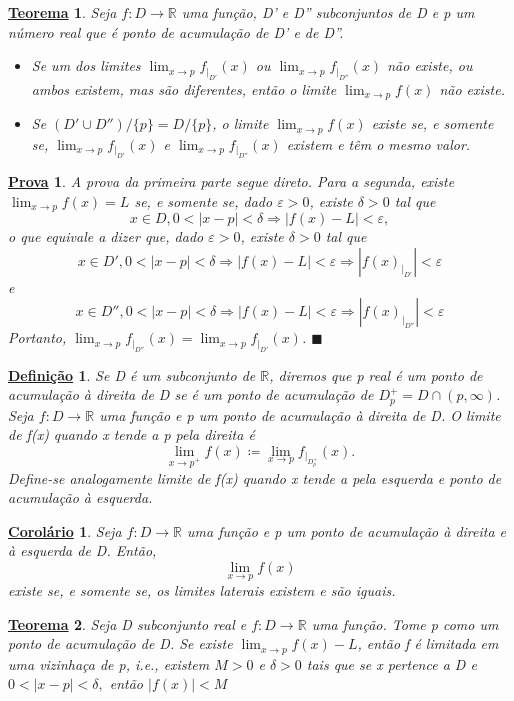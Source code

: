 \documentclass{article}
\newtheorem*{def*}{\underline{Defini\c c\~ao}}
\newtheorem*{theorem*}{\underline{Teorema}}
\newtheorem*{proof*}{\underline{Prova}}
\newtheorem*{crl*}{\underline{Corol\'ario}}
\renewcommand\qedsymbol{$\blacksquare$}
\begin{document}
\begin{theorem*}
  Seja $f:D\rightarrow \mathbb{R}$ uma fun\c c\~ao, D' e D'' subconjuntos de D e p um n\'umero real que \'e ponto de acumula\c c\~ao
de D' e de D''. 
 \begin{itemize}
   \item[i)] Se um dos limites $\lim_{x\to p}f_{|_{D'}}(x)$ ou $\lim_{x\to p}f_{|_{D''}}(x)$ n\~ao existe, ou ambos existem,
     mas s\~ao diferentes, ent\~ao o limite $\lim_{x\to p}f(x)$ n\~ao existe.
   \item[ii)] Se $(D'\cup D'')/\{p\} = D/\{p\}$, o limite $\lim_{x\to p}f(x)$ existe se, e somente se, $\lim_{x\to p}f_{|_{D'}}(x)$ e
$\lim_{x\to p}f_{|_{D''}}(x)$ existem e t\^em o mesmo valor.
 \end{itemize}
\end{theorem*}
\begin{proof*}
  A prova da primeira parte segue direto. Para a segunda, existe $\lim_{x\to p }f(x) = L$ se, e somente se, dado $\varepsilon > 0$,
existe $\delta > 0$ tal que 
  $$
    x\in D, 0 < |x-p| < \delta \Rightarrow |f(x)-L| < \varepsilon,
  $$
  o que equivale a dizer que, dado $\varepsilon > 0$, existe $\delta > 0$ tal que 
    $$
      x\in D', 0 < |x-p| < \delta \Rightarrow |f(x) - L|< \varepsilon \Rightarrow |f(x)_{|_{D'}}|<\varepsilon
    $$
  e
  $$
      x\in D'', 0 < |x-p| < \delta \Rightarrow |f(x) - L|< \varepsilon \Rightarrow |f(x)_{|_{D''}}|<\varepsilon
  $$
  Portanto, $\lim_{x\to p}f_{|_{D''}}(x) = \lim_{x\to p}f_{|_{D'}}(x)$. \qedsymbol
\end{proof*}
\begin{def*}
  Se D \'e um subconjunto de $\mathbb{R}$, diremos que p real \'e um ponto de acumula\c c\~ao \`a direita de D se \'e um ponto
  de acumula\c c\~ao de $D_{p}^{+} = D\cap{(p, \infty)}$. Seja $f:D\rightarrow \mathbb{R}$ uma fun\c c\~ao e p um ponto de
  acumula\c c\~ao \`a direita de D. O limite de f(x) quando x tende a p pela direita \'e 
    $$
      \lim_{x\to p^{+}}f(x)\coloneqq \lim_{x\to p}f_{|_{D_{p}^{+}}}(x).
    $$
  Define-se analogamente limite de f(x) quando x tende a pela esquerda e ponto de acumula\c c\~ao \`a esquerda.
\end{def*}
\begin{crl*}
  Seja $f:D\rightarrow \mathbb{R}$ uma fun\c c\~ao e p um ponto de acumula\c c\~ao \`a direita e \`a esquerda de D. Ent\~ao, 
    $$
      \lim_{x\to p}f(x)
    $$
    existe se, e somente se, os limites laterais existem e s\~ao iguais.
\end{crl*}
\begin{theorem*}
  Seja D subconjunto real e $f:D\rightarrow \mathbb{R}$ uma fun\c c\~ao. Tome p como um ponto de acumula\c c\~ao de D. Se
  existe $\lim_{x\to p}f(x) - L$, ent\~ao f \'e limitada em uma vizinha\c ca de p, i.e., existem $M>0$ e $\delta > 0$ tais que 
  se x pertence a D e $0 <|x-p| < \delta,$ ent\~ao $|f(x)|< M$
\end{theorem*}
\end{document}

